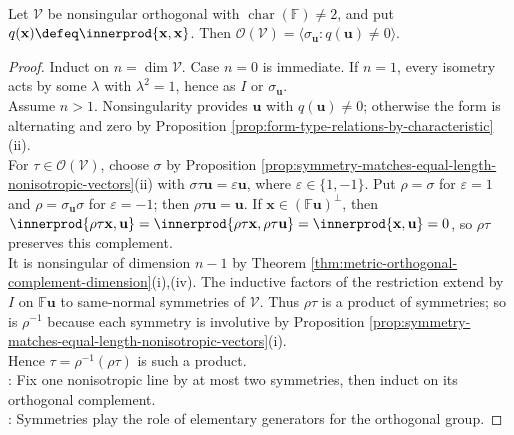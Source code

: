 \begin{theorem} \label{thm:orthogonal-transformations-products-of-symmetries} \\
Let $\mathcal{V}$ be nonsingular orthogonal with $\operatorname{char}(\mathbb{F})\neq2$, and put $q(\mathbf{x})\defeq\innerprod{\mathbf{x},\mathbf{x}}$. Then $\mathcal{O}(\mathcal{V})=\langle\sigma_{\mathbf{u}}:q(\mathbf{u})\neq0\rangle$.
\begin{proof}
Induct on $n=\dim\mathcal{V}$. Case $n=0$ is immediate. If $n=1$, every isometry acts by some $\lambda$ with $\lambda^2=1$, hence as $I$ or $\sigma_{\mathbf{u}}$.\\
Assume $n>1$. Nonsingularity provides $\mathbf{u}$ with $q(\mathbf{u})\neq0$; otherwise the form is alternating and zero by Proposition \ref{prop:form-type-relations-by-characteristic}(ii).\\
For $\tau\in\mathcal{O}(\mathcal{V})$, choose $\sigma$ by Proposition \ref{prop:symmetry-matches-equal-length-nonisotropic-vectors}(ii) with $\sigma\tau\mathbf{u}=\varepsilon\mathbf{u}$, where $\varepsilon\in\{1,-1\}$. Put $\rho=\sigma$ for $\varepsilon=1$ and $\rho=\sigma_{\mathbf{u}}\sigma$ for $\varepsilon=-1$; then $\rho\tau\mathbf{u}=\mathbf{u}$. If $\mathbf{x}\in(\mathbb{F}\mathbf{u})^{\perp}$, then $\innerprod{\rho\tau\mathbf{x},\mathbf{u}}=\innerprod{\rho\tau\mathbf{x},\rho\tau\mathbf{u}}=\innerprod{\mathbf{x},\mathbf{u}}=0$, so $\rho\tau$ preserves this complement.\\
It is nonsingular of dimension $n-1$ by Theorem \ref{thm:metric-orthogonal-complement-dimension}(i),(iv). The inductive factors of the restriction extend by $I$ on $\mathbb{F}\mathbf{u}$ to same-normal symmetries of $\mathcal{V}$. Thus $\rho\tau$ is a product of symmetries; so is $\rho^{-1}$ because each symmetry is involutive by Proposition \ref{prop:symmetry-matches-equal-length-nonisotropic-vectors}(i).\\
Hence $\tau=\rho^{-1}(\rho\tau)$ is such a product.\\
: Fix one nonisotropic line by at most two symmetries, then induct on its orthogonal complement.\\
: Symmetries play the role of elementary generators for the orthogonal group.
\end{proof}
\end{theorem}

